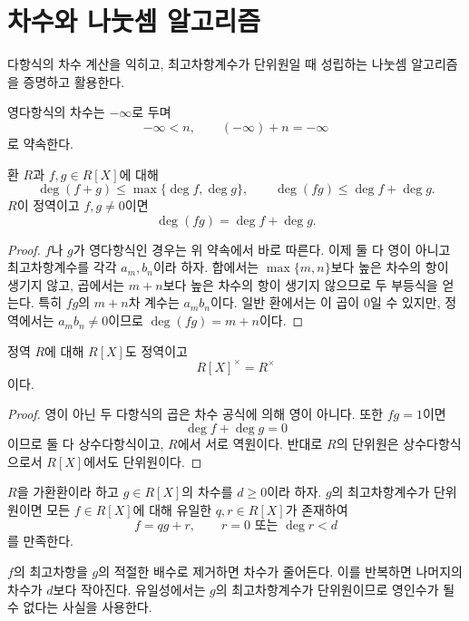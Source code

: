 \section{차수와 나눗셈 알고리즘}
\label{sec:polynomial-division}

\begin{learninggoal}
다항식의 차수 계산을 익히고, 최고차항계수가 단위원일 때 성립하는 나눗셈 알고리즘을 증명하고 활용한다.
\end{learninggoal}

영다항식의 차수는 $-\infty$로 두며
\[
  -\infty<n,
  \qquad
  (-\infty)+n=-\infty
\]
로 약속한다.

\begin{proposition}
환 $R$과 $f,g\in R[X]$에 대해
\[
 \deg(f+g)\le\max\{\deg f,\deg g\},\qquad
 \deg(fg)\le\deg f+\deg g.
\]
$R$이 정역이고 $f,g\ne0$이면
\[
 \deg(fg)=\deg f+\deg g.
\]
\end{proposition}

\begin{proof}
$f$나 $g$가 영다항식인 경우는 위 약속에서 바로 따른다. 이제 둘 다 영이 아니고 최고차항계수를 각각 $a_m,b_n$이라 하자. 합에서는 $\max\{m,n\}$보다 높은 차수의 항이 생기지 않고, 곱에서는 $m+n$보다 높은 차수의 항이 생기지 않으므로 두 부등식을 얻는다. 특히 $fg$의 $m+n$차 계수는 $a_mb_n$이다. 일반 환에서는 이 곱이 $0$일 수 있지만, 정역에서는 $a_mb_n\ne0$이므로 $\deg(fg)=m+n$이다.
\end{proof}

\begin{corollary}
정역 $R$에 대해 $R[X]$도 정역이고
\[
  R[X]^\times=R^\times
\]
이다.
\end{corollary}

\begin{proof}
영이 아닌 두 다항식의 곱은 차수 공식에 의해 영이 아니다. 또한 $fg=1$이면
\[
  \deg f+\deg g=0
\]
이므로 둘 다 상수다항식이고, $R$에서 서로 역원이다. 반대로 $R$의 단위원은 상수다항식으로서 $R[X]$에서도 단위원이다.
\end{proof}

\begin{theorem}
$R$을 가환환이라 하고 $g\in R[X]$의 차수를 $d\ge0$이라 하자. $g$의 최고차항계수가 단위원이면 모든 $f\in R[X]$에 대해 유일한 $q,r\in R[X]$가 존재하여
\[
  f=qg+r,\qquad r=0\text{ 또는 }\deg r<d
\]
를 만족한다.
\end{theorem}

\begin{proofidea}
$f$의 최고차항을 $g$의 적절한 배수로 제거하면 차수가 줄어든다. 이를 반복하면 나머지의 차수가 $d$보다 작아진다. 유일성에서는 $g$의 최고차항계수가 단위원이므로 영인수가 될 수 없다는 사실을 사용한다.
\end{proofidea}

